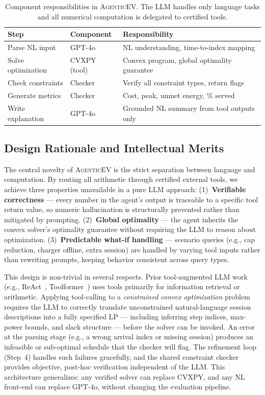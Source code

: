 \documentclass{article}
\newcommand{\modelname}{\textsc{AgenticEV}}
\begin{document}
\begin{table}[ht]
\centering\small
\begin{tabular}{llp{6.5cm}}
\toprule
Step & Component & Responsibility \\
\midrule
Parse NL input     & GPT-4o       & NL understanding, time-to-index mapping \\
Solve optimization & CVXPY (tool) & Convex program, global optimality guarantee \\
Check constraints  & Checker      & Verify all constraint types, return flags \\
Generate metrics   & Checker      & Cost, peak, unmet energy, \% served \\
Write explanation  & GPT-4o       & Grounded NL summary from tool outputs only \\
\bottomrule
\end{tabular}
\caption{Component responsibilities in \modelname{}. The LLM handles only language tasks and all numerical computation is delegated to certified tools.}
\label{tab:agent_roles}
\end{table}

\subsection{Design Rationale and Intellectual Merits}

The central novelty of \modelname{} is the strict separation between language and computation. By routing all arithmetic through certified external tools, we achieve three properties unavailable in a pure LLM approach: (1)~\textbf{Verifiable correctness} — every number in the agent's output is traceable to a specific tool return value, so numeric hallucination is structurally prevented rather than mitigated by prompting. (2)~\textbf{Global optimality} — the agent inherits the convex solver's optimality guarantee without requiring the LLM to reason about optimization. (3)~\textbf{Predictable what-if handling} — scenario queries (e.g., cap reduction, charger offline, extra session) are handled by varying tool inputs rather than rewriting prompts, keeping behavior consistent across query types.

This design is non-trivial in several respects. Prior tool-augmented LLM work (e.g., ReAct~\cite{yao2022react}, Toolformer~\cite{schick2024toolformer}) uses tools primarily for information retrieval or arithmetic. Applying tool-calling to a \emph{constrained convex optimization} problem requires the LLM to correctly translate unconstrained natural-language session descriptions into a fully specified LP — including inferring step indices, max-power bounds, and slack structure — before the solver can be invoked. An error at the parsing stage (e.g., a wrong arrival index or missing session) produces an infeasible or sub-optimal schedule that the checker will flag. The refinement loop (Step~4) handles such failures gracefully, and the shared constraint checker provides objective, post-hoc verification independent of the LLM. This architecture generalizes: any verified solver can replace CVXPY, and any NL front-end can replace GPT-4o, without changing the evaluation pipeline.
\end{document}
